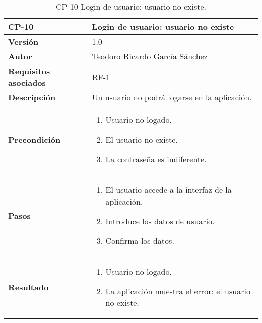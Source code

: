 \begin{table}[p]
	\centering
	\begin{tabularx}{\linewidth}{ p{} p{} }
		\toprule
		\textbf{CP-10}    & \textbf{Login de usuario: usuario no existe}\\
		\toprule
		\textbf{Versión}              & 1.0    \\
		\textbf{Autor}                & Teodoro Ricardo García Sánchez \\
		\textbf{Requisitos asociados} & RF-1 \\
		\textbf{Descripción}          & Un usuario no podrá logarse en la aplicación. \\
		\textbf{Precondición}         & 
		\begin{enumerate}
			\def\labelenumi{\arabic{enumi}.}
			\tightlist
			\item Usuario no logado.
			\item El usuario no existe.
			\item La contraseña es indiferente.
		\end{enumerate}\\
		\textbf{Pasos}             &
		\begin{enumerate}
			\def\labelenumi{\arabic{enumi}.}
			\tightlist
			\item El usuario accede a la interfaz de la aplicación.
			\item Introduce los datos de usuario.
			\item Confirma los datos.
		\end{enumerate}\\
		\textbf{Resultado}          & 
		\begin{enumerate}
			\item Usuario no logado.
			\item La aplicación muestra el error: el usuario no existe.
		\end{enumerate}\\
		\bottomrule
	\end{tabularx}
	\caption{CP-10 Login de usuario: usuario no existe.}
\end{table}


